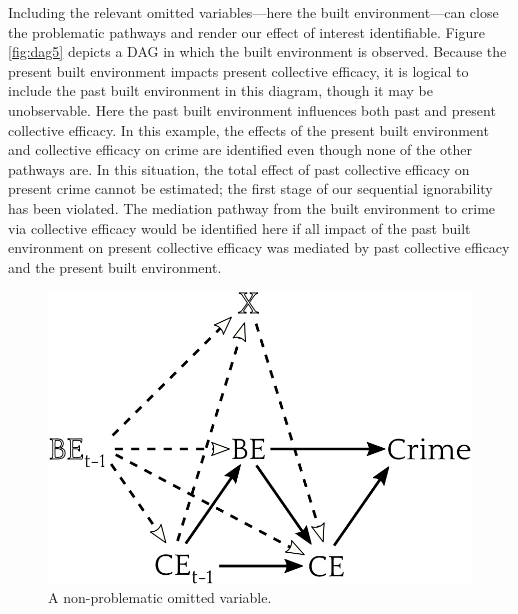 \documentclass [11pt, proquest] {uwthesis}[2015/03/03]
\begin{document}
Including the relevant omitted variables---here the built environment---can close the problematic pathways and render our effect of interest identifiable. Figure \ref{fig:dag5} depicts a DAG in which the built environment is observed. Because the present built environment impacts present collective efficacy, it is logical to include the past built environment in this diagram, though it may be unobservable. Here the past built environment influences both past and present collective efficacy. In this example, the effects of the present built environment and collective efficacy on crime are identified even though none of the other pathways are. In this situation, the total effect of past collective efficacy on present crime cannot be estimated; the first stage of our sequential ignorability has been violated. The mediation pathway from the built environment to crime via collective efficacy would be identified here if all impact of the past built environment on present collective efficacy was mediated by past collective efficacy and the present built environment.\linebreak
\linebreak
\begin{figure}

{\centering \includegraphics[width=0.6\linewidth]{./figure/appendix/6_still_blocked} 

}

\caption{A non-problematic omitted variable.}\label{fig:dag6}
\end{figure}
\end{document}
